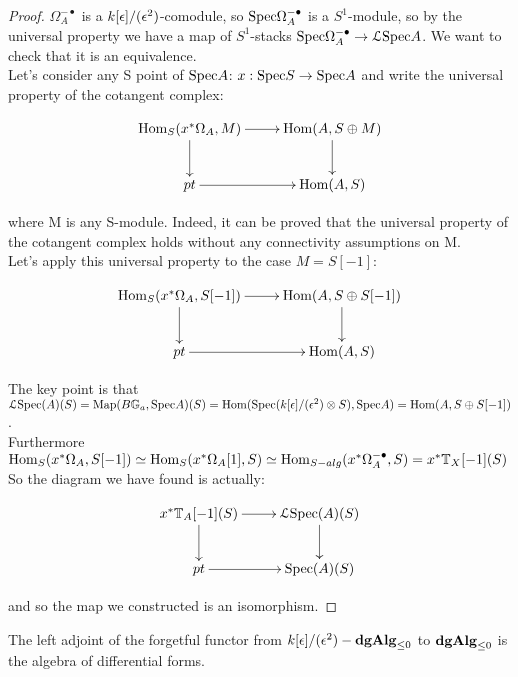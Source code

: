 \begin{refsection}
\begin{proof} $\Omega_A^{-\bullet}$ is a $k[\epsilon]/(\epsilon^2)$-comodule, so $\mathrm{Spec}\Omega_A^{-\bullet}$ is a $S^1$-module, so by the universal property we have a map of $S^1$-stacks
$\mathrm{Spec}\Omega_A^{-\bullet}\to \mathcal{L}\mathrm{Spec} A$. We want to check that it is an equivalence.\\

Let's consider any S point of $\mathrm{Spec} A$: $x:\mathrm{Spec} S\to \mathrm{Spec} A$ and write the universal property of the cotangent complex:

\begin{displaymath}
\xymatrix{
\Hom_S(x^*\Omega_A, M) \ar[r] \ar[d] &  \Hom(A,S\oplus M) \ar[d]\\
 pt \ar[r] & \Hom(A,S)\\
}
\end{displaymath}

where M is any S-module. Indeed, it can be proved \cite{Lu} that the universal property of the cotangent complex holds without any connectivity assumptions on M.\\
Let's apply this universal property to the case $M=S[-1]$:

\begin{displaymath}
\xymatrix{
\Hom_S(x^*\Omega_A, S[-1]) \ar[r] \ar[d] &  \Hom(A,S\oplus S[-1]) \ar[d]\\
 pt \ar[r] & \Hom(A,S)\\
}
\end{displaymath}

The key point is that $\mathcal{L} \mathrm{Spec}(A)(S)=\operatorname{\mathrm{Map}}(B\mathbb{G}_a,\mathrm{Spec} A)(S)=\mathrm{Hom}(\mathrm{Spec}(k[\epsilon]/(\epsilon^2)\otimes S),\mathrm{Spec} A)=\mathrm{Hom}(A,S\oplus S[-1] )$.\\
Furthermore $\mathrm{Hom}_S(x^*\Omega_A, S[-1])\simeq \mathrm{Hom}_S(x^*\Omega_A[1], S)\simeq \mathrm{Hom}_{S-alg}(x^*\Omega_A^{-\bullet}, S)=x^*\mathbb{T}_X[-1](S)$\\
So the diagram we have found is actually:

\begin{displaymath}
\xymatrix{
x^*\mathbb{T}_A[-1](S) \ar[r] \ar[d] &  \L\spec(A)(S) \ar[d]\\
 pt \ar[r] & \spec(A)(S)\\
}
\end{displaymath}

and so the map we constructed is an isomorphism.
\end{proof}

\begin{corollary}
The left adjoint of the forgetful functor from $k[\epsilon]/(\epsilon^2)-\mathbf{dgAlg}_{\leq 0}$ to $\mathbf{dgAlg}_{\leq 0}$ is the algebra of differential forms.
\end{corollary}


\end{refsection}
